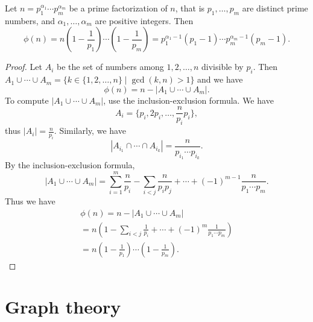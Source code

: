 \begin{page}
\setcounter{section}{5}
\setcounter{subsection}{3}
\setcounter{dfn}{4}
\label{portion:137}

\begin{thm}
Let $n = p_1^{\alpha_1} \cdots p_m^{\alpha_m}$ be a prime factorization of $n$, that is
$p_1, \ldots, p_m$ are distinct prime numbers, and $\alpha_1, \ldots, \alpha_m$ are positive integers.
Then
\[
\phi(n) = n\left(1-\frac{1}{p_1}\right) \cdots \left(1-\frac{1}{p_m}\right)
= p_1^{\alpha_1-1}(p_1-1) \cdots p_m^{\alpha_m-1}(p_m-1).
\]
\end{thm}

\end{page}

\begin{page}
\setcounter{section}{0}
\setcounter{subsection}{0}
\setcounter{dfn}{4}
\label{portion:138}

\begin{proof}
Let $A_i$ be the set of numbers among $1, 2, \ldots, n$ divisible by $p_i$.
Then $A_1 \cup \cdots \cup A_m = \{k \in \{1, 2, \ldots, n\} \mid \gcd(k,n) > 1\}$ and we have
\[
\phi(n) = n - |A_1 \cup \cdots \cup A_m|.
\]
To compute $|A_1 \cup \cdots \cup A_m|$, use the inclusion-exclusion formula.
We have
\[
A_i = \{p_i, 2p_i, \ldots, \frac{n}{p_i} p_i\},
\]
thus $|A_i| = \frac{n}{p_i}$.
Similarly, we have
\[
|A_{i_1} \cap \cdots \cap A_{i_k}| = \frac{n}{p_{i_1} \cdots p_{i_k}}.
\]
By the inclusion-exclusion formula,
\[
|A_1 \cup \cdots \cup A_m| = \sum_{i=1}^m \frac{n}{p_i} - \sum_{i<j} \frac{n}{p_ip_j} + \cdots + (-1)^{m-1} \frac{n}{p_1\cdots p_m}.
\]
Thus we have
\begin{multline*}
\phi(n) = n - |A_1 \cup \cdots \cup A_m|\\
= n \left( 1 - \sum_{i<j} \frac{1}{p_i} + \cdots + (-1)^m \frac{1}{p_1 \cdots p_m} \right)\\
= n \left(1-\frac{1}{p_1}\right) \cdots \left(1-\frac{1}{p_m}\right).
\end{multline*}


\end{proof}





\end{page}

\begin{page}
\setcounter{section}{1}
\setcounter{subsection}{0}
\setcounter{dfn}{4}
\label{portion:139}

\chapter{Graph theory}

\end{page}

